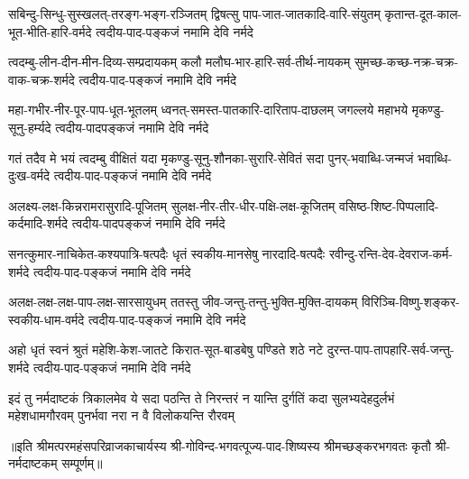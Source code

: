 
\fourlineindentedshloka
{सबिन्दु-सिन्धु-सुस्खलत्-तरङ्ग-भङ्ग-रञ्जितम्}
{द्विषत्सु पाप-जात-जातकादि-वारि-संयुतम्}
{कृतान्त-दूत-काल-भूत-भीति-हारि-वर्मदे}
{त्वदीय-पाद-पङ्कजं नमामि देवि नर्मदे} %

\fourlineindentedshloka
{त्वदम्बु-लीन-दीन-मीन-दिव्य-सम्प्रदायकम्}
{कलौ मलौघ-भार-हारि-सर्व-तीर्थ-नायकम्}
{सुमच्छ-कच्छ-नक्र-चक्र-वाक-चक्र-शर्मदे}
{त्वदीय-पाद-पङ्कजं नमामि देवि नर्मदे} %

\fourlineindentedshloka
{महा-गभीर-नीर-पूर-पाप-धूत-भूतलम्}
{ध्वनत्-समस्त-पातकारि-दारिताप-दाछलम्}
{जगल्लये महाभये मृकण्डु-सूनु-हर्म्यदे}
{त्वदीय-पादपङ्कजं नमामि देवि नर्मदे} %

\fourlineindentedshloka
{गतं तदैव मे भयं त्वदम्बु वीक्षितं यदा}
{मृकण्डु-सूनु-शौनका-सुरारि-सेवितं सदा}
{पुनर्-भवाब्धि-जन्मजं भवाब्धि-दुःख-वर्मदे}
{त्वदीय-पाद-पङ्कजं नमामि देवि नर्मदे} %

\fourlineindentedshloka
{अलक्ष्य-लक्ष-किन्नरामरासुरादि-पूजितम्}
{सुलक्ष-नीर-तीर-धीर-पक्षि-लक्ष-कूजितम्}
{वसिष्ठ-शिष्ट-पिप्पलादि-कर्दमादि-शर्मदे}
{त्वदीय-पादपङ्कजं नमामि देवि नर्मदे} %

\fourlineindentedshloka
{सनत्कुमार-नाचिकेत-कश्यपात्रि-षत्पदैः}
{धृतं स्वकीय-मानसेषु नारदादि-षत्पदैः}
{रवीन्दु-रन्ति-देव-देवराज-कर्म-शर्मदे}
{त्वदीय-पाद-पङ्कजं नमामि देवि नर्मदे} %

\fourlineindentedshloka
{अलक्ष-लक्ष-लक्ष-पाप-लक्ष-सारसायुधम्}
{ततस्तु जीव-जन्तु-तन्तु-भुक्ति-मुक्ति-दायकम्}
{विरिञ्चि-विष्णु-शङ्कर-स्वकीय-धाम-वर्मदे}
{त्वदीय-पाद-पङ्कजं नमामि देवि नर्मदे} %

\fourlineindentedshloka
{अहो धृतं स्वनं श्रुतं महेशि-केश-जातटे}
{किरात-सूत-बाडबेषु पण्डिते शठे नटे}
{दुरन्त-पाप-तापहारि-सर्व-जन्तु-शर्मदे}
{त्वदीय-पाद-पङ्कजं नमामि देवि नर्मदे} %

\fourlineindentedshloka
{इदं तु नर्मदाष्टकं त्रिकालमेव ये सदा}
{पठन्ति ते निरन्तरं न यान्ति दुर्गतिं कदा}
{सुलभ्यदेहदुर्लभं महेशधामगौरवम्}
{पुनर्भवा नरा न वै विलोकयन्ति रौरवम्} %

॥इति श्रीमत्परमहंसपरिव्राजकाचार्यस्य श्री-गोविन्द-भगवत्पूज्य-पाद-शिष्यस्य 
श्रीमच्छङ्करभगवतः कृतौ श्री-नर्मदाष्टकम् सम्पूर्णम्॥